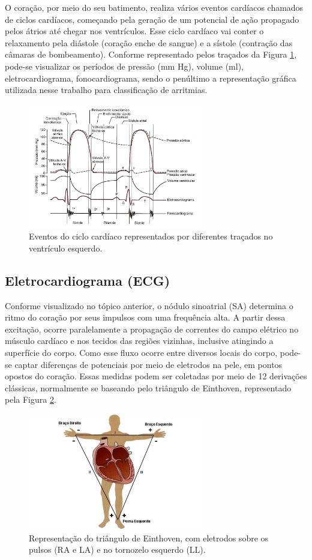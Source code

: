 \documentclass[conference]{IEEEtran}
\begin{document}
O coração, por meio do seu batimento, realiza vários eventos cardíacos chamados de ciclos cardíacos, começando pela geração de um potencial de ação propagado pelos átrios até chegar nos ventrículos. Esse ciclo cardíaco vai conter o relaxamento pela diástole (coração enche de sangue) e a sístole (contração das câmaras de bombeamento). Conforme representado pelos traçados da Figura \ref{eventosCicloCardiaco}, pode-se visualizar os períodos de pressão (mm Hg), volume (ml), eletrocardiograma, fonocardiograma, sendo o penúltimo a representação gráfica utilizada nesse trabalho para classificação de arritmias.

\begin{figure}[!h]
	\centering
	\includegraphics[width=3in]{img/eventosCicloCardiaco}
	\caption{Eventos do ciclo cardíaco representados por diferentes traçados no ventrículo esquerdo.}
	\label{eventosCicloCardiaco}
\end{figure}

\subsection{Eletrocardiograma (ECG)}

Conforme visualizado no tópico anterior, o nódulo sinoatrial (SA) determina o ritmo do coração por seus impulsos com uma frequência alta. A partir dessa excitação, ocorre paralelamente a propagação de correntes do campo elétrico no músculo cardíaco e nos tecidos das regiões vizinhas, inclusive atingindo a superfície do corpo. Como esse fluxo ocorre entre diversos locais do corpo, pode-se captar diferenças de potenciais por meio de eletrodos na pele, em pontos opostos do coração. Essas medidas podem ser coletadas por meio de 12 derivações clássicas, normalmente se baseando pelo triângulo de Einthoven, representado pela Figura \ref{trianguloEinthoven}.

\begin{figure}[!h]
	\centering
	\includegraphics[width=3in]{img/trianguloEinthoven}
	\caption{Representação do triângulo de Einthoven, com eletrodos sobre os pulsos (RA e LA) e no tornozelo esquerdo (LL).}
	\label{trianguloEinthoven}
\end{figure}
\end{document}
